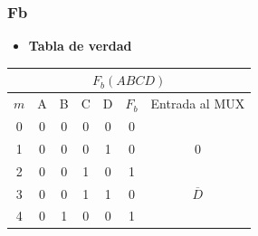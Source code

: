 \subsubsection{Fb}
\begin{itemize}[nosep]\item\textbf{Tabla de verdad}\end{itemize}
\begin{center}
\begin{tabular}{ccccccc}
\multicolumn{7}{c}{\cellcolor[HTML]{FFFFC7}$F_b(ABCD)$}                                                                                                                                                                                                                       \\ \hline
\multicolumn{1}{c|}{\cellcolor[HTML]{9AFF99}$m$} & \cellcolor[HTML]{ECF4FF}A & \cellcolor[HTML]{ECF4FF}B & \cellcolor[HTML]{ECF4FF}C & \multicolumn{1}{c|}{\cellcolor[HTML]{ECF4FF}D} & \multicolumn{1}{c|}{\cellcolor[HTML]{FFCCC9}$F_b$} & Entrada al MUX                   \\ \hline
\multicolumn{1}{c|}{0}                           & 0                         & 0                         & 0                         & \multicolumn{1}{c|}{0}                         & \multicolumn{1}{c|}{0}                             &                                  \\
\multicolumn{1}{c|}{1}                           & 0                         & 0                         & 0                         & \multicolumn{1}{c|}{1}                         & \multicolumn{1}{c|}{0}                             & \multirow{-2}{*}{0}              \\ \hline
\multicolumn{1}{c|}{2}                           & 0                         & 0                         & 1                         & \multicolumn{1}{c|}{0}                         & \multicolumn{1}{c|}{1}                             &                                  \\
\multicolumn{1}{c|}{3}                           & 0                         & 0                         & 1                         & \multicolumn{1}{c|}{1}                         & \multicolumn{1}{c|}{0}                             & \multirow{-2}{*}{$\overline{D}$} \\ \hline
\multicolumn{1}{c|}{4}                           & 0                         & 1                         & 0                         & \multicolumn{1}{c|}{0}                         & \multicolumn{1}{c|}{1}                             &                                  \\

\end{tabular}
\end{center}
